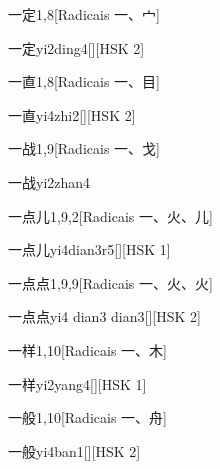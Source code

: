 \begin{entry}{一定}{1,8}[Radicais ⼀、⼧]
  \begin{phonetics}{一定}{yi2ding4}[][HSK 2]
  \end{phonetics}
\end{entry}

\begin{entry}{一直}{1,8}[Radicais ⼀、⽬]
  \begin{phonetics}{一直}{yi4zhi2}[][HSK 2]
  \end{phonetics}
\end{entry}

\begin{entry}{一战}{1,9}[Radicais ⼀、⼽]
  \begin{phonetics}{一战}{yi2zhan4}
  \end{phonetics}
\end{entry}

\begin{entry}{一点儿}{1,9,2}[Radicais ⼀、⽕、⼉]
  \begin{phonetics}{一点儿}{yi4dian3r5}[][HSK 1]
  \end{phonetics}
\end{entry}

\begin{entry}{一点点}{1,9,9}[Radicais ⼀、⽕、⽕]
  \begin{phonetics}{一点点}{yi4 dian3 dian3}[][HSK 2]
  \end{phonetics}
\end{entry}

\begin{entry}{一样}{1,10}[Radicais ⼀、⽊]
  \begin{phonetics}{一样}{yi2yang4}[][HSK 1]
  \end{phonetics}
\end{entry}

\begin{entry}{一般}{1,10}[Radicais ⼀、⾈]
  \begin{phonetics}{一般}{yi4ban1}[][HSK 2]
  \end{phonetics}
\end{entry}

